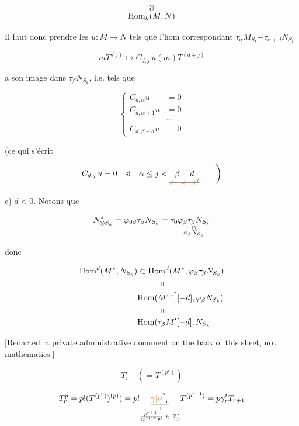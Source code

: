 \[
\overset{\rotatebox{90}{$\simeq$}}{\mathrm{Hom}_k(M,N)}
\]

Il faut donc prendre les $u:M\longrightarrow N$ tels que l'hom correspondant $\tau_\alpha M_{S_k}\mathord{-}\tau_{\alpha+d}N_{S_k}$

\[
mT^{(j)}\longmapsto C_{d,j}\,u(m)T^{(d+j)}
\]

 a son image dans $\tau_\beta N_{S_k}$, i.e. tels que

\[
\left\{\begin{aligned}
C_{d,\alpha}u&=0\\
C_{d,\alpha+1}u&=0\\
&\cdots\\
C_{d,\beta-d}u&=0
\end{aligned}\right.
\]

(ce qui s'écrit

\[
C_{d,j}\,u=0\quad\text{si}\quad\alpha\leq j<\underset{\deleted{\unsure{\beta-d+1}}}{\beta-d}\qquad\bigg)
\]

c) \uline{$d<0$}. Notons que

\[
N^{*}_{\deleted{\otimes}S_k}=\varphi_{0\beta}\tau_\beta N_{S_k}=\tau_0\underset{\substack{\cap\\\varphi_\beta N_{S_k}}}{\varphi_\beta\tau_\beta N_{S_k}}
\]

donc 

\[
\begin{aligned}
\mathrm{Hom}^{d}(M^{*},N_{S_k})&\subset\mathrm{Hom}^{d}(M^{*},\varphi_\beta\tau_\beta N_{S_k})\\
&\hspace{9mm}\shortparallel\\
&\mathrm{Hom}(M^{\unsure{\prime|*}}[-d],\varphi_\beta N_{S_k})\\
&\hspace{9mm}\shortparallel\\
&\mathrm{Hom}(\tau_\beta M^{\prime}[-d],N_{S_k}
\end{aligned}
\]

[Redacted: a private administrative document on the back of this sheet, not mathematics.]


\[
T_r\quad(=T^{(p^r)})
\]


\[
T_r^p=p!(T^{(p^r)})^{(p)})=p!\underset{\substack{\shortparallel\\\frac{p^{r+1}!}{(p^r!)^p\,p!}\ \in\ \mathbb{Z}_p^{*}}}{\underline{\unsure{\gamma|\nu}_r}}T^{(p^{r+1})}=p\gamma'_r T_{r+1}
\]

